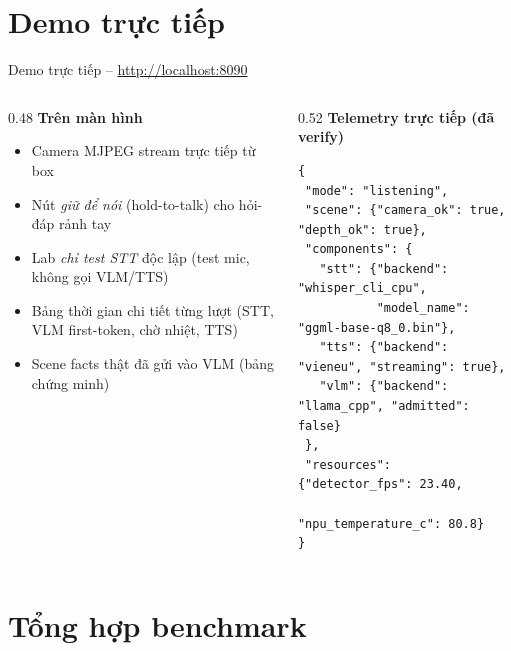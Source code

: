 \documentclass[aspectratio=169]{beamer}
\begin{document}
\section{Demo trực tiếp}

\begin{frame}[fragile]{Demo trực tiếp -- \url{http://localhost:8090}}
  \begin{columns}[T]
    \begin{column}{0.48\textwidth}
      \textbf{Trên màn hình}
      \begin{itemize}
        \item Camera MJPEG stream trực tiếp từ box
        \item Nút \emph{giữ để nói} (hold-to-talk) cho hỏi-đáp rảnh tay
        \item Lab \emph{chỉ test STT} độc lập (test mic, không gọi VLM/TTS)
        \item Bảng thời gian chi tiết từng lượt (STT, VLM first-token,
              chờ nhiệt, TTS)
        \item Scene facts thật đã gửi vào VLM (bảng chứng minh)
      \end{itemize}
    \end{column}
    \begin{column}{0.52\textwidth}
      \textbf{Telemetry trực tiếp (đã verify)}
\begin{lstlisting}
{
 "mode": "listening",
 "scene": {"camera_ok": true, "depth_ok": true},
 "components": {
   "stt": {"backend": "whisper_cli_cpu",
           "model_name": "ggml-base-q8_0.bin"},
   "tts": {"backend": "vieneu", "streaming": true},
   "vlm": {"backend": "llama_cpp", "admitted": false}
 },
 "resources": {"detector_fps": 23.40,
               "npu_temperature_c": 80.8}
}
\end{lstlisting}
    \end{column}
  \end{columns}
\end{frame}

\section{Tổng hợp benchmark}
\end{document}
